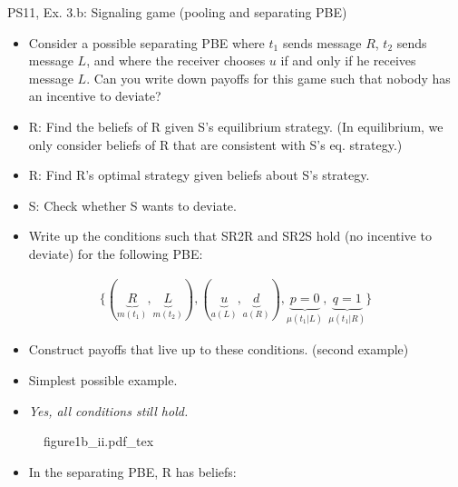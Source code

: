 \begin{frame}{PS11, Ex. 3.b: Signaling game (pooling and separating PBE)}
    \begin{itemize}
        \item[(b)] Consider a possible separating PBE where $t_1$ sends message $R$, $t_2$ sends message $L$, and where the receiver chooses $u$ if and only if he receives message $L$. Can you write down payoffs for this game such that nobody has an incentive to deviate?
    \end{itemize} \vspace{-8pt}
    \begin{multicols}{2}
      \begin{itemize}
        \item[SR3:] R: Find the beliefs of R given S's equilibrium strategy. (In equilibrium, we only consider beliefs of R that are consistent with S's eq. strategy.)
        \item[SR2R:] R: Find R's optimal strategy given beliefs about S's strategy.
        \item[SR2S:] S: Check whether S wants to deviate.
        \item[PBE:]  Write up the conditions such that SR2R and SR2S hold (no incentive to deviate) for the following PBE:
      \end{itemize}\vspace{-14pt}
      \begin{align*}
        \{(\underbrace{R}_{m(t_1)},\underbrace{L}_{m(t_2)}),(\underbrace{u}_{a(L)},\underbrace{d}_{a(R)}),\underbrace{p=0}_{\mu(t_1|L)},\underbrace{q=1}_{\mu(t_1|R)}\}
      \end{align*}\vspace{-12pt}
      \begin{itemize}
        \item[$\rightarrow$] Construct payoffs that live up to these conditions. (second example)
        \item[i:] Simplest possible example.
        \item[ii:] \textit{Yes, all conditions still hold.}
      \end{itemize}
      \vfill\null\columnbreak
      \begin{figure}[!h]
        \center{}
        {figure1b_ii.pdf_tex}
      \end{figure} \vspace{-8pt}
      \begin{itemize}
        \item[SR3:] In the separating PBE, R has beliefs:\vspace{-10pt}

\end{itemize}
\end{multicols}
\end{frame}
